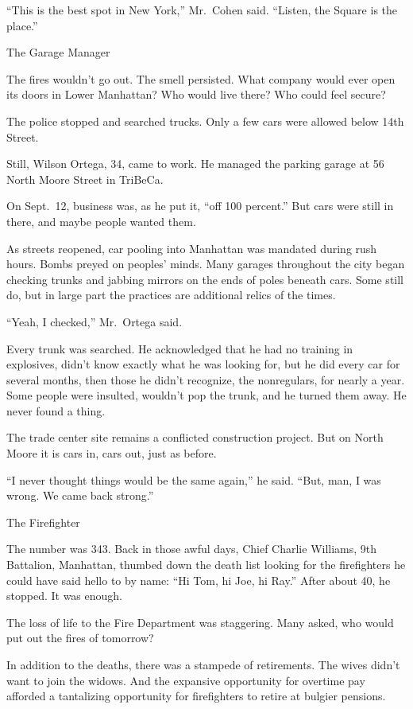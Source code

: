 ﻿\documentclass[12pt]{article}
\begin{document}
``This is the best spot in New York,'' Mr.~Cohen said. ``Listen, the Square is the place.''

The Garage Manager

The fires wouldn't go out. The smell persisted. What company would ever open its doors in Lower
Manhattan? Who would live there? Who could feel secure?

The police stopped and searched trucks. Only a few cars were allowed below 14th Street.

Still, Wilson Ortega, 34, came to work. He managed the parking garage at 56 North Moore Street in
TriBeCa.

On Sept.~12, business was, as he put it, ``off 100 percent.'' But cars were still in there, and
maybe people wanted them.

As streets reopened, car pooling into Manhattan was mandated during rush hours. Bombs preyed on
peoples' minds. Many garages throughout the city began checking trunks and jabbing mirrors on the
ends of poles beneath cars. Some still do, but in large part the practices are additional relics of
the times.

``Yeah, I checked,'' Mr.~Ortega said.

Every trunk was searched. He acknowledged that he had no training in explosives, didn't know exactly
what he was looking for, but he did every car for several months, then those he didn't recognize,
the nonregulars, for nearly a year. Some people were insulted, wouldn't pop the trunk, and he turned
them away. He never found a thing.

The trade center site remains a conflicted construction project. But on North Moore it is cars in,
cars out, just as before.

``I never thought things would be the same again,'' he said. ``But, man, I was wrong. We came back
strong.''

The Firefighter

The number was 343. Back in those awful days, Chief Charlie Williams, 9th Battalion, Manhattan,
thumbed down the death list looking for the firefighters he could have said hello to by name: ``Hi
Tom, hi Joe, hi Ray.'' After about 40, he stopped. It was enough.

The loss of life to the Fire Department was staggering. Many asked, who would put out the fires of
tomorrow?

In addition to the deaths, there was a stampede of retirements. The wives didn't want to join the
widows. And the expansive opportunity for overtime pay afforded a tantalizing opportunity for
firefighters to retire at bulgier pensions.
\end{document}
